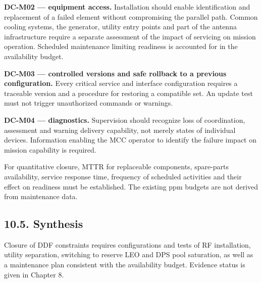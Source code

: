 \textbf{DC-M02 — equipment access.} Installation should enable identification and replacement of a failed element without compromising the parallel path. Common cooling systems, the generator, utility entry points and part of the antenna infrastructure require a separate assessment of the impact of servicing on mission operation. Scheduled maintenance limiting readiness is accounted for in the availability budget.

\textbf{DC-M03 — controlled versions and safe rollback to a previous configuration.} Every critical service and interface configuration requires a traceable version and a procedure for restoring a compatible set. An update test must not trigger unauthorized commands or warnings.

\textbf{DC-M04 — diagnostics.} Supervision should recognize loss of coordination, assessment and warning delivery capability, not merely states of individual devices. Information enabling the MCC operator to identify the failure impact on mission capability is required.

For quantitative closure, MTTR for replaceable components, spare-parts availability, service response time, frequency of scheduled activities and their effect on readiness must be established. The existing ppm budgets are not derived from maintenance data.

\subsection{10.5. Synthesis}\label{ddjf-10-5}

Closure of DDF constraints requires configurations and tests of RF installation, utility separation, switching to reserve LEO and DPS pool saturation, as well as a maintenance plan consistent with the availability budget. Evidence status is given in Chapter 8.

\par\noindent{\color{TableBorderBlue}\rule{\linewidth}{0.4pt}}\par
